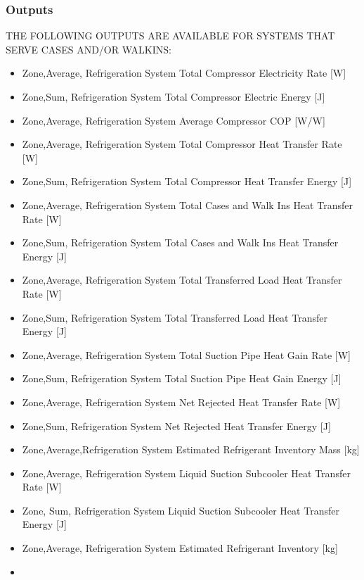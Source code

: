 \subsubsection{Outputs}\label{outputs-2-018}

THE FOLLOWING OUTPUTS ARE AVAILABLE FOR SYSTEMS THAT SERVE CASES AND/OR WALKINS:

\begin{itemize}
\item
  Zone,Average, Refrigeration System Total Compressor Electricity Rate {[}W{]}
\item
  Zone,Sum, Refrigeration System Total Compressor Electric Energy {[}J{]}
\item
  Zone,Average, Refrigeration System Average Compressor COP {[}W/W{]}
\item
  Zone,Average, Refrigeration System Total Compressor Heat Transfer Rate {[}W{]}
\item
  Zone,Sum, Refrigeration System Total Compressor Heat Transfer Energy {[}J{]}
\item
  Zone,Average, Refrigeration System Total Cases and Walk Ins Heat Transfer Rate {[}W{]}
\item
  Zone,Sum, Refrigeration System Total Cases and Walk Ins Heat Transfer Energy {[}J{]}
\item
  Zone,Average, Refrigeration System Total Transferred Load Heat Transfer Rate {[}W{]}
\item
  Zone,Sum, Refrigeration System Total Transferred Load Heat Transfer Energy {[}J{]}
\item
  Zone,Average, Refrigeration System Total Suction Pipe Heat Gain Rate {[}W{]}
\item
  Zone,Sum, Refrigeration System Total Suction Pipe Heat Gain Energy {[}J{]}
\item
  Zone,Average, Refrigeration System Net Rejected Heat Transfer Rate {[}W{]}
\item
  Zone,Sum, Refrigeration System Net Rejected Heat Transfer Energy {[}J{]}
\item
  Zone,Average,Refrigeration System Estimated Refrigerant Inventory Mass {[}kg{]}
\item
  Zone,Average, Refrigeration System Liquid Suction Subcooler Heat Transfer Rate {[}W{]}
\item
  Zone, Sum, Refrigeration System Liquid Suction Subcooler Heat Transfer Energy {[}J{]}
\item
  Zone,Average, Refrigeration System Estimated Refrigerant Inventory {[}kg{]}
\item

\end{itemize}
